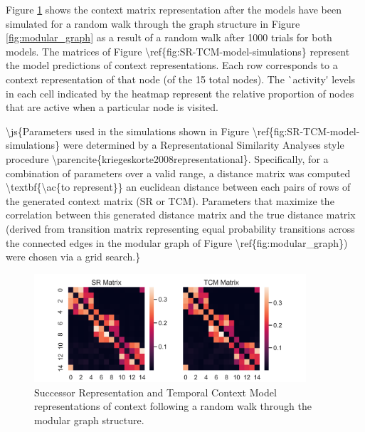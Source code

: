 
 Figure \ref{fig:SR-TCM-model-simulations} shows the context matrix representation after the models have been simulated for a random walk through the graph structure in Figure \ref{fig:modular_graph} as a result of a random walk after 1000 trials for both models. \ac{The matrices of Figure \ref{fig:SR-TCM-model-simulations} represent the model predictions of context representations. Each row corresponds to a context representation of that node (of the 15 total nodes). The `activity' levels in each cell indicated by the heatmap represent the relative proportion of nodes that are active when a particular node is visited.} 

\ac{\js{Parameters used in the simulations shown in Figure \ref{fig:SR-TCM-model-simulations} were determined by a Representational Similarity Analyses style procedure \parencite{kriegeskorte2008representational}. Specifically, for a combination of parameters over a valid range, a distance matrix was computed \textbf{\ac{to represent}} an euclidean distance between each pairs of rows of the generated context matrix (SR or TCM). Parameters that maximize the correlation between this generated distance matrix and the true distance matrix (derived from transition matrix representing equal probability transitions across the connected edges in the modular graph of Figure \ref{fig:modular_graph}) were chosen via a grid search.}} 

\begin{figure}[!ht]
	\centering
	\includegraphics[width = 0.9\textwidth]{chapter_notebooks/chapter_2/figures/SR_vs_TCM_Matrices.png}
	\caption{Successor Representation and Temporal Context Model representations of context following a random walk through the modular graph structure.}
	\label{fig:SR-TCM-model-simulations}
\end{figure}


